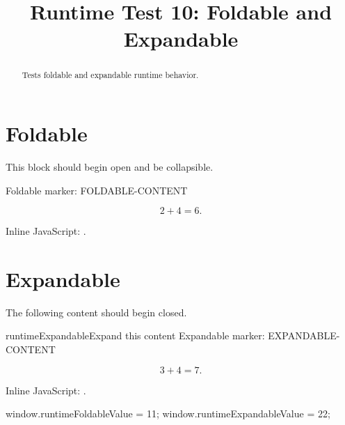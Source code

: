 \documentclass{ximera}
\title{Runtime Test 10: Foldable and Expandable}
\begin{document}
\begin{abstract}
Tests foldable and expandable runtime behavior.
\end{abstract}
\maketitle

\section{Foldable}

This block should begin open and be collapsible.

\begin{foldable}
Foldable marker: FOLDABLE-CONTENT

\[
2+4=6.
\]

Inline JavaScript:
.
\end{foldable}

\section{Expandable}

The following content should begin closed.

\begin{expandable}{runtimeExpandable}{Expand this content}
Expandable marker: EXPANDABLE-CONTENT

\[
3+4=7.
\]

Inline JavaScript:
.
\end{expandable}

\begin{javascript}
window.runtimeFoldableValue = 11;
window.runtimeExpandableValue = 22;
\end{javascript}
\end{document}
